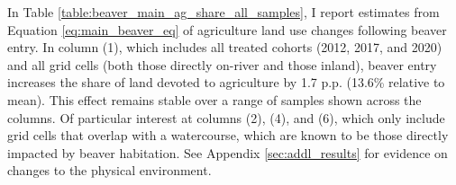 In Table \ref{table:beaver_main_ag_share_all_samples}, I report estimates from Equation \ref{eq:main_beaver_eq} of agriculture land use changes following beaver entry. In column (1), which includes all treated cohorts (2012, 2017, and 2020) and all grid cells (both those directly on-river and those inland), beaver entry increases the share of land devoted to agriculture by 1.7 p.p. (13.6\% relative to mean). This effect remains stable over a range of samples shown across the columns. Of particular interest at columns (2), (4), and (6), which only include grid cells that overlap with a watercourse, which are known to be those directly impacted by beaver habitation. See Appendix \ref{sec:addl_results} for evidence on changes to the physical environment.


